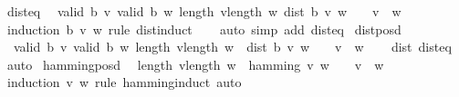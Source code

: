 \begin{isabellebody}
\endisatagproof
{\isafoldproof}%
%
\isadelimproof
\isanewline
%
\endisadelimproof
\isanewline
{}\isamarkupfalse%
\ dist{\isacharunderscore}{\kern0pt}eq{\isacharcolon}{\kern0pt}\isanewline
\ \ {\isachardoublequoteopen}{\isasymlbrakk}valid\ b\ v{\isacharsemicolon}{\kern0pt}\ valid\ b\ w{\isacharsemicolon}{\kern0pt}\ length\ v{\isacharequal}{\kern0pt}length\ w{\isacharsemicolon}{\kern0pt}\ dist\ b\ v\ w\ {\isacharequal}{\kern0pt}\ {}{\isasymrbrakk}\ {\isasymLongrightarrow}\ v\ {\isacharequal}{\kern0pt}\ w{\isachardoublequoteclose}\isanewline
%
\isadelimproof
\ \ %
\endisadelimproof
%
\isatagproof
{}\isamarkupfalse%
\ {\isacharparenleft}{\kern0pt}induction\ b\ v\ w\ rule{\isacharcolon}{\kern0pt}\ dist{\isachardot}{\kern0pt}induct{\isacharparenright}{\kern0pt}\isanewline
\ \ \isamarkupfalse%
\ {\isacharparenleft}{\kern0pt}auto\ simp\ add{\isacharcolon}{\kern0pt}\ dist{}{\isacharunderscore}{\kern0pt}eq{\isacharparenright}{\kern0pt}%
\endisatagproof
{\isafoldproof}%
%
\isadelimproof
\isanewline
%
\endisadelimproof
\isanewline
{}\isamarkupfalse%
\ dist{\isacharunderscore}{\kern0pt}posd{\isacharcolon}{\kern0pt}\isanewline
\ \ {\isachardoublequoteopen}{\isasymlbrakk}valid\ b\ v{\isacharsemicolon}{\kern0pt}\ valid\ b\ w{\isacharsemicolon}{\kern0pt}\ length\ v{\isacharequal}{\kern0pt}length\ w{\isasymrbrakk}\ {\isasymLongrightarrow}\ {\isacharparenleft}{\kern0pt}dist\ b\ v\ w\ {\isacharequal}{\kern0pt}\ {}{\isacharparenright}{\kern0pt}\ {\isacharequal}{\kern0pt}\ {\isacharparenleft}{\kern0pt}v\ {\isacharequal}{\kern0pt}\ w{\isacharparenright}{\kern0pt}{\isachardoublequoteclose}\isanewline
%
\isadelimproof
\ \ %
\endisadelimproof
%
\isatagproof
{}\isamarkupfalse%
\ dist{\isacharunderscore}{\kern0pt}{}\ dist{\isacharunderscore}{\kern0pt}eq\ \isamarkupfalse%
\ auto%
\endisatagproof
{\isafoldproof}%
%
\isadelimproof
\isanewline
%
\endisadelimproof
\isanewline
{}\isamarkupfalse%
\ hamming{\isacharunderscore}{\kern0pt}posd{\isacharcolon}{\kern0pt}\isanewline
\ \ {\isachardoublequoteopen}length\ v{\isacharequal}{\kern0pt}length\ w\ {\isasymLongrightarrow}\ {\isacharparenleft}{\kern0pt}hamming\ v\ w\ {\isacharequal}{\kern0pt}\ {}{\isacharparenright}{\kern0pt}\ {\isacharequal}{\kern0pt}\ {\isacharparenleft}{\kern0pt}v\ {\isacharequal}{\kern0pt}\ w{\isacharparenright}{\kern0pt}{\isachardoublequoteclose}\isanewline
%
\isadelimproof
\ \ %
\endisadelimproof
%
\isatagproof
{}\isamarkupfalse%
\ {\isacharparenleft}{\kern0pt}induction\ v\ w\ rule{\isacharcolon}{\kern0pt}\ hamming{\isachardot}{\kern0pt}induct{\isacharparenright}{\kern0pt}\ auto%

\end{isabellebody}
